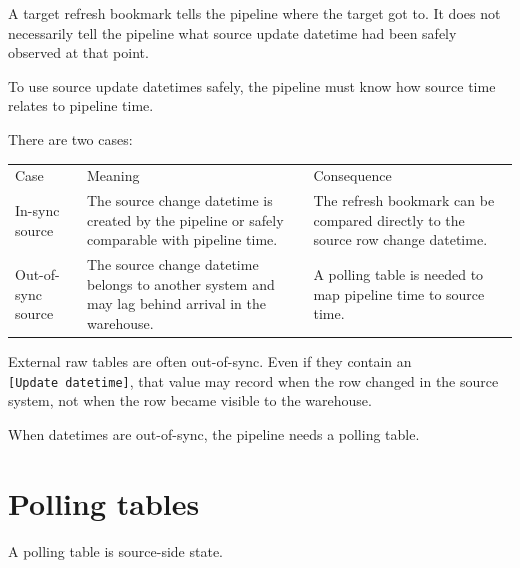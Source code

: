 \documentclass[10pt,openany,10pt]{book}
\newcounter{none}
\let\podeToprule\toprule
\let\podeMidrule\midrule
\let\podeBottomrule\bottomrule
\renewcommand{\toprule}{\arrayrulecolor{pbiGrid}\podeToprule}
\renewcommand{\midrule}{\arrayrulecolor{pbiGrid}\podeMidrule}
\renewcommand{\bottomrule}{\arrayrulecolor{pbiGrid}\podeBottomrule}
\begin{document}
A target refresh bookmark tells the pipeline where the target got to. It
does not necessarily tell the pipeline what source update datetime had
been safely observed at that point.

To use source update datetimes safely, the pipeline must know how source
time relates to pipeline time.

There are two cases:

{\def\LTcaptype{none} %
\begin{longtable}[]{@{}
  >{\raggedright\arraybackslash}p{}
  >{\raggedright\arraybackslash}p{}
  >{\raggedright\arraybackslash}p{}@{}}
\toprule\noalign{}
\begin{minipage}[b]{\linewidth}\raggedright
Case
\end{minipage} & \begin{minipage}[b]{\linewidth}\raggedright
Meaning
\end{minipage} & \begin{minipage}[b]{\linewidth}\raggedright
Consequence
\end{minipage} \\
\midrule\noalign{}
\endhead
\bottomrule\noalign{}
\endlastfoot
In-sync source & The source change datetime is created by the pipeline
or safely comparable with pipeline time. & The refresh bookmark can be
compared directly to the source row change datetime. \\
Out-of-sync source & The source change datetime belongs to another
system and may lag behind arrival in the warehouse. & A polling table is
needed to map pipeline time to source time. \\
\end{longtable}
}

External raw tables are often out-of-sync. Even if they contain an
\texttt{{[}Update\ datetime{]}}, that value may record when the row
changed in the source system, not when the row became visible to the
warehouse.

When datetimes are out-of-sync, the pipeline needs a polling table.

\section{Polling tables}\label{polling-tables}

A polling table is source-side state.
\end{document}
